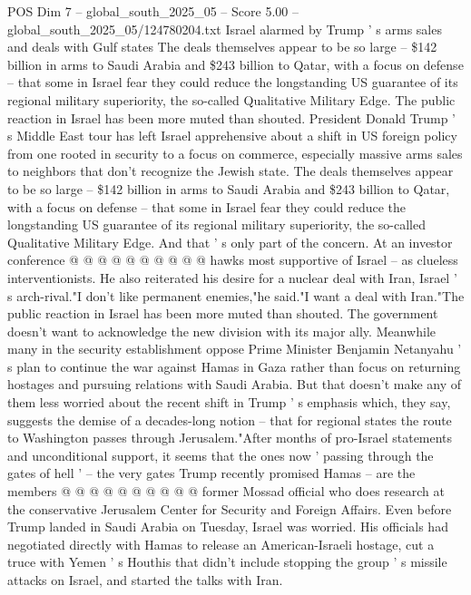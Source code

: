 \begin{textsample}{POS Dim 7 – global\_south\_2025\_05 – Score 5.00 – global\_south\_2025\_05/124780204.txt}  \label{ex:f7_pos_436}
Israel alarmed by Trump ' s arms sales and deals with Gulf states The deals themselves appear to be so large -- \$142 billion in arms to Saudi Arabia and \$243 billion to Qatar, with a focus on defense -- that some in Israel fear they could reduce the longstanding US guarantee of its regional military superiority, the so-called Qualitative Military Edge.
The public reaction in Israel has been more muted than shouted.
President Donald Trump ' s Middle East tour has left Israel apprehensive about a shift in US foreign policy from one rooted in security to a focus on commerce, especially massive arms sales to neighbors that don't recognize the Jewish state.
The deals themselves appear to be so large -- \$142 billion in arms to Saudi Arabia and \$243 billion to Qatar, with a focus on defense -- that some in Israel fear they could reduce the longstanding US guarantee of its regional military superiority, the so-called Qualitative Military Edge.
And that ' s only part of the concern.
At an investor conference @ @ @ @ @ @ @ @ @ @ hawks most supportive of Israel -- as clueless interventionists.
He also reiterated his desire for a nuclear deal with Iran, Israel ' s arch-rival."I don't like permanent enemies,"he said."I want a deal with Iran."The public reaction in Israel has been more muted than shouted.
The government doesn't want to acknowledge the new division with its major ally.
Meanwhile many in the security establishment oppose Prime Minister Benjamin Netanyahu ' s plan to continue the war against Hamas in Gaza rather than focus on returning hostages and pursuing relations with Saudi Arabia.
But that doesn't make any of them less worried about the recent shift in Trump ' s emphasis which, they say, suggests the demise of a decades-long notion -- that for regional states the route to Washington passes through Jerusalem."After months of pro-Israel statements and unconditional support, it seems that the ones now ' passing through the gates of hell ' -- the very gates Trump recently promised Hamas -- are the members @ @ @ @ @ @ @ @ @ @ former Mossad official who does research at the conservative Jerusalem Center for Security and Foreign Affairs.
Even before Trump landed in Saudi Arabia on Tuesday, Israel was worried.
His officials had negotiated directly with Hamas to release an American-Israeli hostage, cut a truce with Yemen ' s Houthis that didn't include stopping the group ' s missile attacks on Israel, and started the talks with Iran.

\end{textsample}
